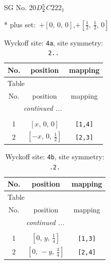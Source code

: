 \documentclass[fleqn,8pt]{jsarticle}
\begin{document}
\setcounter{MaxMatrixCols}{32}

\renewcommand{\tablename}{Table~}
\renewcommand{\figurename}{Figure~}
\begin{center}
\LARGE
SG No. 20\quad$D_{\rm 2}^{5}$\quad$C222_1$\quad[ orthorhombic ]
\end{center}
* plus set:\,\,\,$+\left[ 0,\, 0,\, 0 \right]$,\quad $+\left[ \frac{1}{2},\, \frac{1}{2},\, 0 \right]$
\renewcommand{\arraystretch}{1.2}
\begin{longtable}{ccc}
\caption{Wyckoff site: {\tt 4a}, site symmetry: {\tt 2..}}
 \\
 \hline \hline
No. & position & mapping \\ \hline \endfirsthead

\multicolumn{2}{l}{\tablename\ \thetable{}} \\
 \hline \hline
No. & position & mapping \\ \hline \endhead

 \hline \hline
\multicolumn{2}{r}{\footnotesize\it continued ...} \\ \endfoot

 \hline \hline
\multicolumn{2}{r}{} \\ \endlastfoot

1 & $\left[ x,\, 0,\, 0 \right]$ & {\tt [1,4]} \\ \hline
2 & $\left[ - x,\, 0,\, \frac{1}{2} \right]$ & {\tt [2,3]} \\
\end{longtable}
\renewcommand{\arraystretch}{1.2}
\begin{longtable}{ccc}
\caption{Wyckoff site: {\tt 4b}, site symmetry: {\tt .2.}}
 \\
 \hline \hline
No. & position & mapping \\ \hline \endfirsthead

\multicolumn{2}{l}{\tablename\ \thetable{}} \\
 \hline \hline
No. & position & mapping \\ \hline \endhead

 \hline \hline
\multicolumn{2}{r}{\footnotesize\it continued ...} \\ \endfoot

 \hline \hline
\multicolumn{2}{r}{} \\ \endlastfoot

1 & $\left[ 0,\, y,\, \frac{1}{4} \right]$ & {\tt [1,3]} \\ \hline
2 & $\left[ 0,\, - y,\, \frac{3}{4} \right]$ & {\tt [2,4]} \\
\end{longtable}
\end{document}
